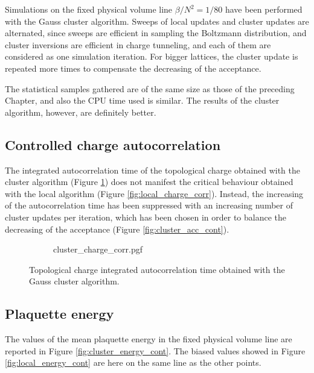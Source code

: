 Simulations on the fixed physical volume line $\beta/N^2=1/80$ have been performed with the Gauss cluster algorithm.
Sweeps of local updates and cluster updates are alternated, since sweeps are efficient in sampling the Boltzmann distribution,
and cluster inversions are efficient in charge tunneling, and each of them are considered as one simulation iteration.
For bigger lattices, the cluster update is repeated more times to compensate the decreasing of the acceptance.

The statistical samples gathered are of the same size as those of the preceding Chapter,
and also the CPU time used is similar.
The results of the cluster algorithm, however, are definitely better.

\subsection*{Controlled charge autocorrelation}
The integrated autocorrelation time of the topological charge obtained with the cluster algorithm (Figure \ref{fig:cluster_charge_corr})
does not manifest the critical behaviour obtained with the local algorithm (Figure \ref{fig:local_charge_corr}).
Instead, the increasing of the autocorrelation time has been suppressed with an increasing number of cluster updates per iteration,
which has been chosen in order to balance the decreasing of the acceptance (Figure \ref{fig:cluster_acc_cont}).

\begin{figure}[!htb]
    \centering
    \begin{subfigure}{\textwidth}
        \centering
        {cluster_charge_corr.pgf}
    \end{subfigure}\vspace{1.5em}
    \begin{subfigure}{\textwidth}
        \centering
        
    \end{subfigure}
    \caption{Topological charge integrated autocorrelation time obtained with the Gauss cluster algorithm.}
    \label{fig:cluster_charge_corr}
\end{figure}

\subsection*{Plaquette energy}
The values of the mean plaquette energy in the fixed physical volume line are reported in Figure \ref{fig:cluster_energy_cont}.
The biased values showed in Figure \ref{fig:local_energy_cont} are here on the same line as the other points.

